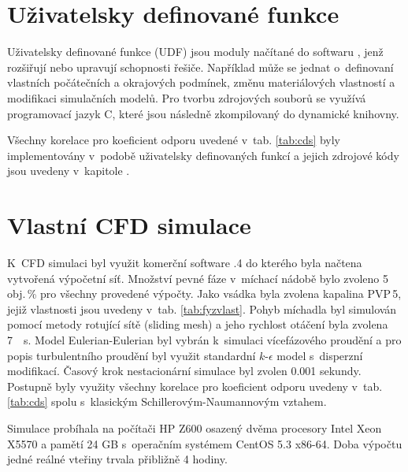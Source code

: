 \section{Uživatelsky definované funkce}
Uživatelsky definované funkce (UDF) jsou moduly načítané do softwaru \flu, jenž rozšiřují nebo upravují schopnosti řešiče. Například může se jednat o~definovaní vlastních počátečních a okrajových podmínek, změnu materiálových vlastností a modifikaci simulačních modelů. Pro tvorbu zdrojových souborů se využívá programovací jazyk C, které jsou následně zkompilovaný do dynamické knihovny.

Všechny korelace pro koeficient odporu uvedené v~tab. \ref{tab:cds} byly implementovány v~podobě uživatelsky definovaných funkcí a jejich zdrojové kódy jsou uvedeny v~kapitole .

\section{Vlastní CFD simulace}
K~CFD simulaci byl využit komerční software .4 do kterého byla načtena vytvořená výpočetní síť. Množství pevné fáze v~míchací nádobě bylo zvoleno 5\,obj.\,\% pro všechny provedené výpočty. Jako vsádka byla zvolena kapalina PVP\,5, jejiž vlastnosti jsou uvedeny v~tab. \ref{tab:fyzvlast}. Pohyb míchadla byl simulován pomocí metody rotující sítě (sliding mesh) a jeho rychlost otáčení byla zvolena \SI{7}{\per\second}. Model Eulerian-Eulerian byl vybrán k~simulaci vícefázového proudění a pro popis turbulentního proudění byl využit standardní $k\mbox{-}\epsilon$ model s~disperzní modifikací. Časový krok nestacionární simulace byl zvolen \num{0.001} sekundy. Postupně byly využity všechny korelace pro koeficient odporu uvedeny v~tab. \ref{tab:cds} spolu s~klasickým Schillerovým-Naumannovým vztahem. 

Simulace probíhala na počítači HP Z600 osazený dvěma procesory Intel Xeon X5570 a pamětí 24 GB s~operačním systémem CentOS 5.3 x86-64. Doba výpočtu jedné reálné vteřiny trvala přibližně 4 hodiny.


